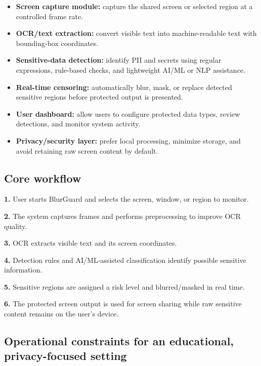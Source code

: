 \documentclass[12pt,a4paper]{article}
\begin{document}
\begin{itemize}
    \item \textbf{Screen capture module:} capture the shared screen or selected region at a controlled frame rate.

    \item \textbf{OCR/text extraction:} convert visible text into machine-readable text with bounding-box coordinates.

    \item \textbf{Sensitive-data detection:} identify PII and secrets using regular expressions, rule-based checks, and lightweight AI/ML or NLP assistance.

    \item \textbf{Real-time censoring:} automatically blur, mask, or replace detected sensitive regions before protected output is presented.

    \item \textbf{User dashboard:} allow users to configure protected data types, review detections, and monitor system activity.

    \item \textbf{Privacy/security layer:} prefer local processing, minimize storage, and avoid retaining raw screen content by default.
\end{itemize}

\subsection{Core workflow}

\textbf{1.} User starts BlurGuard and selects the screen, window, or region to monitor.

\textbf{2.} The system captures frames and performs preprocessing to improve OCR quality.

\textbf{3.} OCR extracts visible text and its screen coordinates.

\textbf{4.} Detection rules and AI/ML-assisted classification identify possible sensitive information.

\textbf{5.} Sensitive regions are assigned a risk level and blurred/masked in real time.

\textbf{6.} The protected screen output is used for screen sharing while raw sensitive content remains on the user's device.

\subsection{Operational constraints for an educational, privacy-focused setting}
\end{document}

